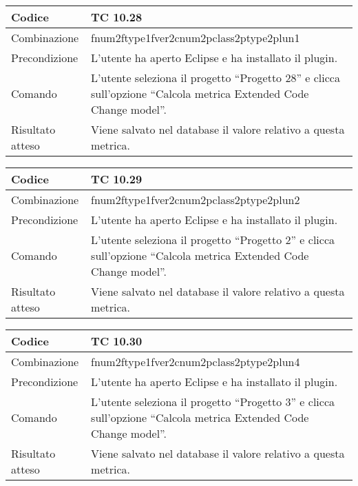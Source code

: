 \begin{table}[ht]
\begin{tabular}{|p{3cm}|p{9cm}|}
\hline
\cellcolor{lightgray}Codice				& TC 10.28								\\
\hline
\cellcolor{lightgray}Combinazione		& fnum2ftype1fver2cnum2pclass2ptype2plun1									\\
\hline
\cellcolor{lightgray}Precondizione		& L'utente ha aperto Eclipse e ha installato il plugin.		\\
\hline
\cellcolor{lightgray}Comando			& L'utente seleziona il progetto ``Progetto 28''  e clicca sull'opzione ``Calcola metrica Extended Code Change model''.	\\
\hline
\cellcolor{lightgray}Risultato atteso	& Viene salvato nel database il valore relativo a questa metrica.\\
\hline
\end{tabular}
\end{table}

\begin{table}[ht]
\begin{tabular}{|p{3cm}|p{9cm}|}
\hline
\cellcolor{lightgray}Codice				& TC 10.29								\\
\hline
\cellcolor{lightgray}Combinazione		& fnum2ftype1fver2cnum2pclass2ptype2plun2									\\
\hline
\cellcolor{lightgray}Precondizione		& L'utente ha aperto Eclipse e ha installato il plugin.		\\
\hline
\cellcolor{lightgray}Comando			& L'utente seleziona il progetto ``Progetto 2''  e clicca sull'opzione ``Calcola metrica Extended Code Change model''.	\\
\hline
\cellcolor{lightgray}Risultato atteso	& Viene salvato nel database il valore relativo a questa metrica.\\
\hline
\end{tabular}
\end{table}

\begin{table}[ht]
\begin{tabular}{|p{3cm}|p{9cm}|}
\hline
\cellcolor{lightgray}Codice				& TC 10.30								\\
\hline
\cellcolor{lightgray}Combinazione		& fnum2ftype1fver2cnum2pclass2ptype2plun4									\\
\hline
\cellcolor{lightgray}Precondizione		& L'utente ha aperto Eclipse e ha installato il plugin.		\\
\hline
\cellcolor{lightgray}Comando			& L'utente seleziona il progetto ``Progetto 3''  e clicca sull'opzione ``Calcola metrica Extended Code Change model''.	\\
\hline
\cellcolor{lightgray}Risultato atteso	& Viene salvato nel database il valore relativo a questa metrica.\\
\hline
\end{tabular}
\end{table}

